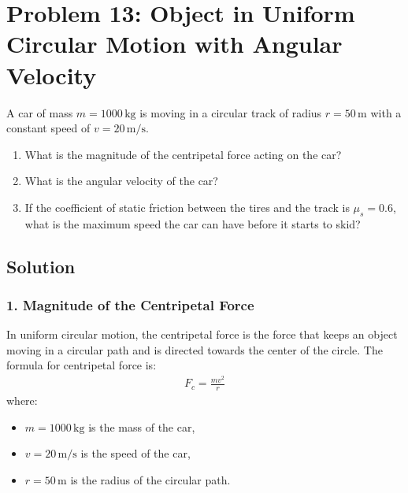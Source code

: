 \documentclass[letterpaper,10pt,english]{jupyterBook}
\begin{document}
\section{Problem 13: Object in Uniform Circular Motion with Angular Velocity}
\label{\detokenize{prerequisites:problem-13-object-in-uniform-circular-motion-with-angular-velocity}}
\sphinxAtStartPar
A car of mass \(m = 1000 \, \text{kg}\) is moving in a circular track of radius \(r = 50 \, \text{m}\) with a constant speed of \(v = 20 \, \text{m/s}\).
\begin{enumerate}
%
\item {} 
\sphinxAtStartPar
What is the magnitude of the centripetal force acting on the car?

\item {} 
\sphinxAtStartPar
What is the angular velocity of the car?

\item {} 
\sphinxAtStartPar
If the coefficient of static friction between the tires and the track is \(\mu_s = 0.6\), what is the maximum speed the car can have before it starts to skid?

\end{enumerate}


\subsection{Solution}
\label{\detokenize{prerequisites:id17}}

\subsubsection{1. Magnitude of the Centripetal Force}
\label{\detokenize{prerequisites:magnitude-of-the-centripetal-force}}
\sphinxAtStartPar
In uniform circular motion, the centripetal force is the force that keeps an object moving in a circular path and is directed towards the center of the circle. The formula for centripetal force is:
\begin{equation*}
\begin{split}
F_c = \frac{mv^2}{r}
\end{split}
\end{equation*}
\sphinxAtStartPar
where:
\begin{itemize}
\item {} 
\sphinxAtStartPar
\(m = 1000 \, \text{kg}\) is the mass of the car,

\item {} 
\sphinxAtStartPar
\(v = 20 \, \text{m/s}\) is the speed of the car,

\item {} 
\sphinxAtStartPar
\(r = 50 \, \text{m}\) is the radius of the circular path.

\end{itemize}
\end{document}

